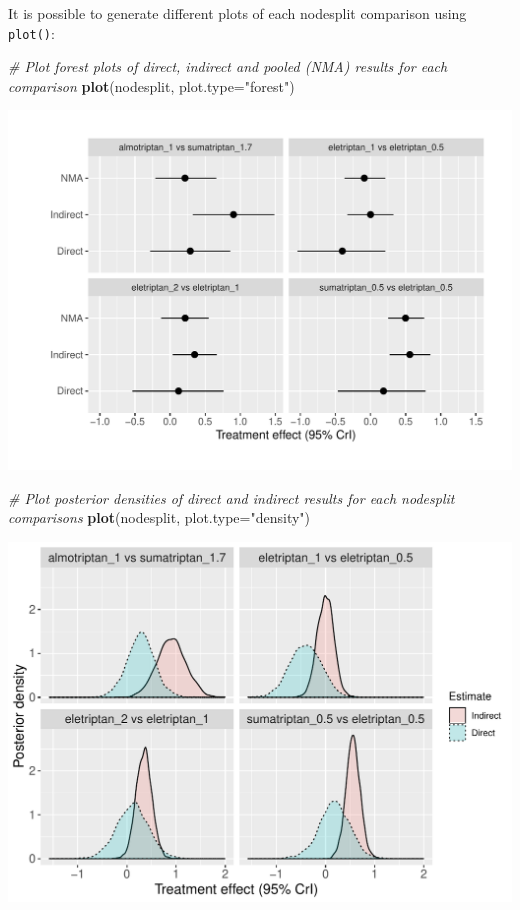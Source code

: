 \documentclass[]{article}
\newenvironment{Shaded}{\begin{snugshade}}{\end{snugshade}}
\newcommand{\CommentTok}[1]{\textcolor[rgb]{0.56,0.35,0.01}{\textit{#1}}}
\newcommand{\DataTypeTok}[1]{\textcolor[rgb]{0.13,0.29,0.53}{#1}}
\newcommand{\KeywordTok}[1]{\textcolor[rgb]{0.13,0.29,0.53}{\textbf{#1}}}
\newcommand{\NormalTok}[1]{#1}
\newcommand{\StringTok}[1]{\textcolor[rgb]{0.31,0.60,0.02}{#1}}
\begin{document}
It is possible to generate different plots of each nodesplit comparison
using \texttt{plot()}:

\begin{Shaded}
\begin{Highlighting}[]
\CommentTok{# Plot forest plots of direct, indirect and pooled (NMA) results for each comparison}
\KeywordTok{plot}\NormalTok{(nodesplit, }\DataTypeTok{plot.type=}\StringTok{"forest"}\NormalTok{)}
\end{Highlighting}
\end{Shaded}

\includegraphics{mbnmadose_files/figure-latex/unnamed-chunk-51-1.pdf}

\begin{Shaded}
\begin{Highlighting}[]

\CommentTok{# Plot posterior densities of direct and indirect results for each nodesplit comparisons}
\KeywordTok{plot}\NormalTok{(nodesplit, }\DataTypeTok{plot.type=}\StringTok{"density"}\NormalTok{)}
\end{Highlighting}
\end{Shaded}

\includegraphics{mbnmadose_files/figure-latex/unnamed-chunk-51-2.pdf}
\end{document}
